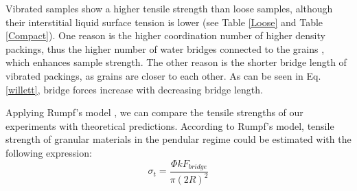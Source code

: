 Vibrated samples show a higher tensile strength than loose samples, although their interstitial liquid surface tension is lower (see Table \ref{Loose} and Table \ref{Compact}). One reason is the higher coordination number of higher density packings, thus the higher number of water bridges connected to the grains \cite{German2014,Kim2003,Kohonen2004}, which enhances sample strength. The other reason is the shorter bridge length of vibrated packings, as grains are closer to each other. As can be seen in Eq. \eqref{willett}, bridge forces increase with decreasing bridge length.

Applying Rumpf's model \cite{Rumpf1962}, we can compare the tensile strengths of our experiments with theoretical predictions. According to Rumpf's model, tensile strength of granular materials in the pendular regime could be estimated with the following expression:
\begin{equation}\label{rumpf}
\displaystyle \sigma_t=\frac{\Phi kF_{bridge}}{\pi {\left(2R\right)}^2}
\end{equation}
